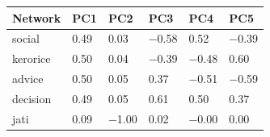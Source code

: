 \begin{table}
\centering
\begin{tabular}[t]{llllll}
\toprule
Network & PC1 & PC2 & PC3 & PC4 & PC5\\
\midrule
social & \num{0.49} & \num{0.03} & \num{-0.58} & \num{0.52} & \num{-0.39}\\
kerorice & \num{0.50} & \num{0.04} & \num{-0.39} & \num{-0.48} & \num{0.60}\\
advice & \num{0.50} & \num{0.05} & \num{0.37} & \num{-0.51} & \num{-0.59}\\
decision & \num{0.49} & \num{0.05} & \num{0.61} & \num{0.50} & \num{0.37}\\
jati & \num{0.09} & \num{-1.00} & \num{0.02} & \num{-0.00} & \num{0.00}\\
\bottomrule
\end{tabular}
\end{table}
